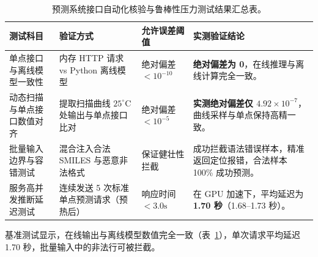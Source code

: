 \begin{table}[htbp]
\centering\small
\caption{预测系统接口自动化核验与鲁棒性压力测试结果汇总表。}
\label{tab:v2-app-check}
\begin{tabularx}{\linewidth}{@{}lllX@{}}
\toprule
测试科目 & 验证方式 & 允许误差阈值 & 实测验证结论 \\
\midrule
单点接口与离线模型一致性 & 内存 HTTP 请求 vs Python 离线模型 & 绝对偏差 $< 10^{-10}$ & \textbf{绝对偏差为 0}，在线推理与离线计算完全一致。 \\
动态扫描与单点接口数值对齐 & 提取扫描曲线 $25^\circ\text{C}$ 处输出与单点接口比对 & 绝对偏差 $< 10^{-5}$ & \textbf{实测绝对偏差仅 $4.92\times10^{-7}$}，曲线采样与单点保持高精一致。 \\
批量输入边界与容错测试 & 混合注入合法 SMILES 与恶意非法格式 & 保证健壮性拦截 & 成功拦截语法错误样本，精准返回定位报错，合法样本 100\% 成功预测。 \\
服务高并发推断延迟测试 & 连续发送 5 次标准单点预测请求（预热后） & 响应时间 $< 3.0\mathrm{s}$ & 在 GPU 加速下，平均延迟为 \textbf{1.70 秒}（1.68--1.73 秒）。 \\
\bottomrule
\end{tabularx}
\end{table}

基准测试显示，在线输出与离线模型数值完全一致（表~\ref{tab:v2-app-check}），单次请求平均延迟 1.70 秒，批量输入中的非法行可被拦截。
